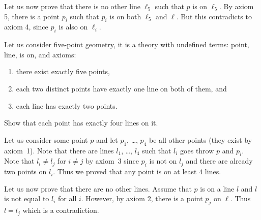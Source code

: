 \begin{chapterendexercises}
\begin{solution}
          Let us now prove that there is no other line $\ell_5$ such that $p$ is
          on $\ell_5$. By axiom 5, there is a point $p_i$ such that $p_i$ is on
          both $\ell_5$ and $\ell$. But this contradicts to axiom 4, since $p_i$
          is also on $\ell_i$.
        \end{solution}
    \exercise Let us consider five-point geometry, it is a theory with undefined
      terms: point, line, is on, and axioms:
      \begin{enumerate}
        \item there exist exactly five points,
        \item each two distinct points have exactly one line on both of them, and
        \item each line has exactly two points.
      \end{enumerate}

      Show that each point has exactly four lines on it.
      \begin{solution}
        Let us consider some point $p$ and let $p_1$, \dots, $p_4$ be all other
        points (they exist by axiom~1). Note that there are lines $l_1$, \dots,
        $l_4$ such that $l_i$ goes throw $p$ and $p_i$. Note that $l_i \neq l_j$
        for $i \neq j$ by axiom~3 since $p_i$ is not on $l_j$ and there are
        already two points on $l_i$. Thus we proved that any point is on at
        least $4$ lines.

        Let us now prove that there are no other lines. Assume that $p$ is on a
        line $l$ and $l$ is not equal to $l_i$ for all $i$. However, by axiom 2,
        there is a point $p_j$ on $\ell$. Thus $l = l_j$ which is a contradiction.
      \end{solution}
\end{chapterendexercises}
